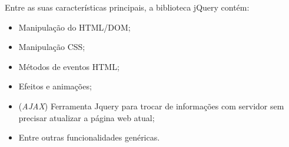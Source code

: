         Entre as suas características principais, a biblioteca jQuery contém:

        \begin{itemize}
            \item Manipulação do HTML/DOM;
            \item Manipulação CSS;
            \item Métodos de eventos HTML;
            \item Efeitos e animações;
            \item (\emph{AJAX}) Ferramenta Jquery para trocar de informações com servidor sem precisar atualizar a página web atual;
            \item Entre outras funcionalidades genéricas.
        \end{itemize}
